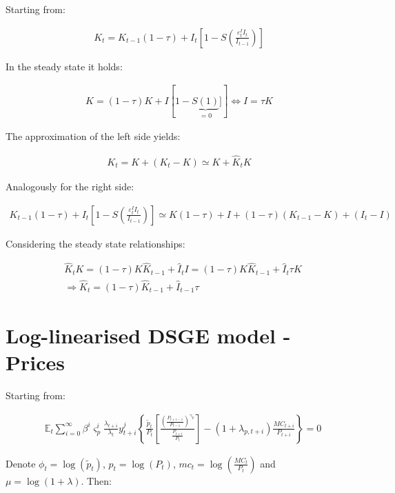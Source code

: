 \documentclass{pracamgr}
\numberwithin{equation}{section}
\begin{document}
Starting from:

\begin{align}
K_{t} = K_{t-1} (1 - \tau) + I_{t} \left[ 1 - S \left(\frac{\varepsilon_{t}^{I}I_{t}}{I_{t-1}} \right) \right]
\end{align}

In the steady state it holds:

\begin{align}
K =  (1 - \tau)K + I \left[ 1 - \underbrace{S (1)}_{=0}] \right] \iff I = \tau K
\end{align}

The approximation of the left side yields:

\begin{align}
K_{t} = K + \left(K_{t} - K \right) \simeq K + \hat{K}_{t}K
\end{align}

Analogously for the right side:

\begin{align}
K_{t-1} (1 - \tau) + I_{t} \left[ 1 - S \left(\frac{\varepsilon_{t}^{I}I_{t}}{I_{t-1}} \right) \right] \simeq K(1 - \tau) + I + (1 - \tau) \left(K_{t-1} - K \right) + \left( I_{t} - I \right)
\end{align}

Considering the steady state relationships:

\begin{align}
&\hat{K}_{t}K = (1 - \tau)K \hat{K}_{t-1} + \hat{I}_{t}I = (1 - \tau)K \hat{K}_{t-1} + \hat{I}_{t}\tau K \nonumber \\
& \Rightarrow \hat{K}_{t} = (1 - \tau) \hat{K}_{t-1} + \hat{I}_{t-1}\tau
\end{align} 

\section*{Log-linearised DSGE model - Prices}

Starting from:

\begin{align} &\mathbb{E}_{t}  \sum\limits_{i=0}^{\infty} \beta^{i} \varsigma_{p}^{i} \frac{\lambda_{t+i}}{\lambda_{t}} y_{t+i}^{j} \left\{ \frac{\widetilde{p}_{t}}{P_{t}} \left[ \frac{ \left(\frac{P_{t+i-1}}{P_{t-1}} \right)^{\gamma_{p}}}{\frac{P_{t+i}}{P_{t}}} \right] - (1+\lambda_{p,t+i})\frac{MC_{t+i}}{P_{t+i}} \right\} = 0
\end{align}

Denote $\phi_{t} = \log(\widetilde{p}_{t})$, $p_{t} = \log(P_{t})$, $mc_{t} = \log \left(\frac{MC_{t}}{P_{t}} \right)$ and $ \mu = \log(1+\lambda)$. Then:
\end{document}
